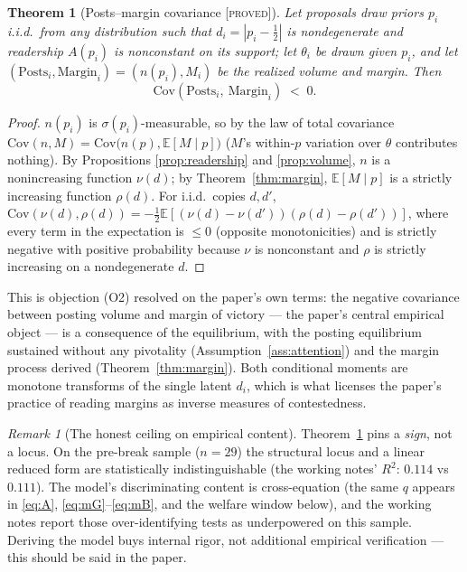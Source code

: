 \documentclass[11pt]{article}
\newtheorem{theorem}{Theorem}
\theoremstyle{remark}
\newtheorem{remark}{Remark}
\newcommand{\E}{\mathbb{E}}
\newcommand{\Cov}{\mathrm{Cov}}
\newcommand{\statusP}{\textsc{[proved]}}
\begin{document}
\begin{theorem}[Posts--margin covariance \statusP]\label{thm:cov}
Let proposals draw priors $p_i$ i.i.d.\ from any distribution such that
$d_i=|p_i-\tfrac12|$ is nondegenerate and readership $A(p_i)$ is nonconstant on
its support; let $\theta_i$ be drawn given $p_i$, and let
$(\text{Posts}_i,\text{Margin}_i)=(n(p_i),M_i)$ be the realized volume and
margin. Then
\[
\Cov(\text{Posts}_i,\ \text{Margin}_i)\;<\;0 .
\]
\end{theorem}

\begin{proof}
$n(p_i)$ is $\sigma(p_i)$-measurable, so by the law of total covariance
$\Cov(n,M)=\Cov\bigl(n(p),\E[M\mid p]\bigr)$ ($M$'s within-$p$ variation over
$\theta$ contributes nothing). By Propositions \ref{prop:readership} and
\ref{prop:volume}, $n$ is a nonincreasing function $\nu(d)$; by
Theorem~\ref{thm:margin}, $\E[M\mid p]$ is a strictly increasing function
$\rho(d)$. For i.i.d.\ copies $d,d'$,
$\Cov(\nu(d),\rho(d))=-\tfrac12\E[(\nu(d)-\nu(d'))(\rho(d)-\rho(d'))]$, where
every term in the expectation is $\le0$ (opposite monotonicities) and is
strictly negative with positive probability because $\nu$ is nonconstant and
$\rho$ is strictly increasing on a nondegenerate $d$.
\end{proof}

This is objection (O2) resolved on the paper's own terms: the negative
covariance between posting volume and margin of victory --- the paper's central
empirical object --- is a consequence of the equilibrium, with the posting
equilibrium sustained without any pivotality (Assumption~\ref{ass:attention})
and the margin process derived (Theorem~\ref{thm:margin}). Both conditional
moments are monotone transforms of the single latent $d_i$, which is what
licenses the paper's practice of reading margins as inverse measures of
contestedness.

\begin{remark}[The honest ceiling on empirical content]
Theorem~\ref{thm:cov} pins a \emph{sign}, not a locus. On the pre-break sample
($n=29$) the structural locus and a linear reduced form are statistically
indistinguishable (the working notes' $R^2$: $0.114$ vs $0.111$). The model's
discriminating content is cross-equation (the same $q$ appears in
\eqref{eq:A}, \eqref{eq:mG}--\eqref{eq:mB}, and the welfare window below), and
the working notes report those over-identifying tests as underpowered on this
sample. Deriving the model buys internal rigor, not additional empirical
verification --- this should be said in the paper.
\end{remark}
\end{document}
